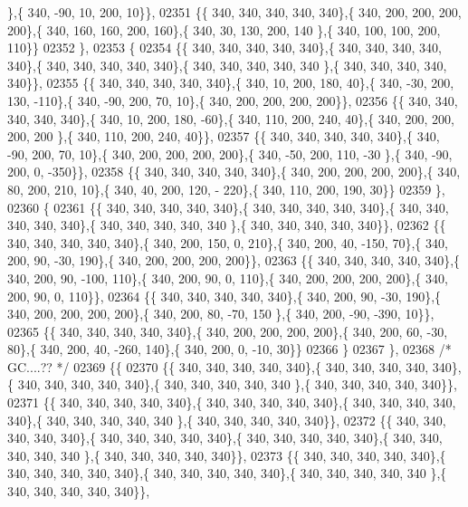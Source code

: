 \begin{DoxyCode}
      \},\{ 340, -90,  10, 200,  10\}\},
02351 \{\{ 340, 340, 340, 340, 340\},\{ 340, 200, 200, 200, 200\},\{ 340, 160, 160, 200, 160\},\{ 340,  30, 130, 200, 140
      \},\{ 340, 100, 100, 200, 110\}\}
02352 \},
02353 \{
02354 \{\{ 340, 340, 340, 340, 340\},\{ 340, 340, 340, 340, 340\},\{ 340, 340, 340, 340, 340\},\{ 340, 340, 340, 340, 340
      \},\{ 340, 340, 340, 340, 340\}\},
02355 \{\{ 340, 340, 340, 340, 340\},\{ 340,  10, 200, 180,  40\},\{ 340, -30, 200, 130, -110\},\{ 340, -90, 200,  70,  
      10\},\{ 340, 200, 200, 200, 200\}\},
02356 \{\{ 340, 340, 340, 340, 340\},\{ 340,  10, 200, 180, -60\},\{ 340, 110, 200, 240,  40\},\{ 340, 200, 200, 200, 200
      \},\{ 340, 110, 200, 240,  40\}\},
02357 \{\{ 340, 340, 340, 340, 340\},\{ 340, -90, 200,  70,  10\},\{ 340, 200, 200, 200, 200\},\{ 340, -50, 200, 110, -30
      \},\{ 340, -90, 200,   0, -350\}\},
02358 \{\{ 340, 340, 340, 340, 340\},\{ 340, 200, 200, 200, 200\},\{ 340,  80, 200, 210,  10\},\{ 340,  40, 200, 120, -
      220\},\{ 340, 110, 200, 190,  30\}\}
02359 \},
02360 \{
02361 \{\{ 340, 340, 340, 340, 340\},\{ 340, 340, 340, 340, 340\},\{ 340, 340, 340, 340, 340\},\{ 340, 340, 340, 340, 340
      \},\{ 340, 340, 340, 340, 340\}\},
02362 \{\{ 340, 340, 340, 340, 340\},\{ 340, 200, 150,   0, 210\},\{ 340, 200,  40, -150,  70\},\{ 340, 200,  90, -30, 
      190\},\{ 340, 200, 200, 200, 200\}\},
02363 \{\{ 340, 340, 340, 340, 340\},\{ 340, 200,  90, -100, 110\},\{ 340, 200,  90,   0, 110\},\{ 340, 200, 200, 200, 
      200\},\{ 340, 200,  90,   0, 110\}\},
02364 \{\{ 340, 340, 340, 340, 340\},\{ 340, 200,  90, -30, 190\},\{ 340, 200, 200, 200, 200\},\{ 340, 200,  80, -70, 150
      \},\{ 340, 200, -90, -390,  10\}\},
02365 \{\{ 340, 340, 340, 340, 340\},\{ 340, 200, 200, 200, 200\},\{ 340, 200,  60, -30,  80\},\{ 340, 200,  40, -260, 
      140\},\{ 340, 200,   0, -10,  30\}\}
02366 \}
02367 \},
02368 \textcolor{comment}{/* GC....?? */}
02369 \{\{
02370 \{\{ 340, 340, 340, 340, 340\},\{ 340, 340, 340, 340, 340\},\{ 340, 340, 340, 340, 340\},\{ 340, 340, 340, 340, 340
      \},\{ 340, 340, 340, 340, 340\}\},
02371 \{\{ 340, 340, 340, 340, 340\},\{ 340, 340, 340, 340, 340\},\{ 340, 340, 340, 340, 340\},\{ 340, 340, 340, 340, 340
      \},\{ 340, 340, 340, 340, 340\}\},
02372 \{\{ 340, 340, 340, 340, 340\},\{ 340, 340, 340, 340, 340\},\{ 340, 340, 340, 340, 340\},\{ 340, 340, 340, 340, 340
      \},\{ 340, 340, 340, 340, 340\}\},
02373 \{\{ 340, 340, 340, 340, 340\},\{ 340, 340, 340, 340, 340\},\{ 340, 340, 340, 340, 340\},\{ 340, 340, 340, 340, 340
      \},\{ 340, 340, 340, 340, 340\}\},

\end{DoxyCode}
